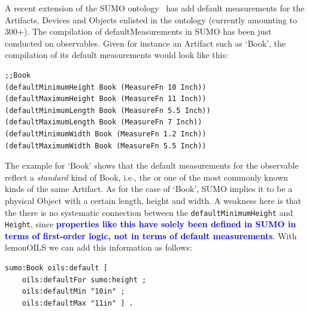 \documentclass[11pt]{article}
\begin{document}
A recent extension of the SUMO ontology~\cite[Suggested Upper Merged Ontology]{nilespease2001sumo} has add
default measurements for the Artifacts, Devices and Objects enlisted in the ontology (currently amounting to 300+). 
The compilation of defaultMeasurements in SUMO has been just conducted on observables. Given for instance an Artifact such as `Book', the compilation of its default measurements would look like this:

\begin{verbatim}
;;Book
(defaultMinimumHeight Book (MeasureFn 10 Inch))
(defaultMaximumHeight Book (MeasureFn 11 Inch))
(defaultMinimumLength Book (MeasureFn 5.5 Inch))
(defaultMaximumLength Book (MeasureFn 7 Inch))
(defaultMinimumWidth Book (MeasureFn 1.2 Inch))
(defaultMaximumWidth Book (MeasureFn 5.5 Inch))
\end{verbatim}


The example for `Book' shows that the default measurements for the observable reflect a \textit{standard} kind of Book,
i.e., the or one of the most commonly known kinds of the same Artifact. As for the case of `Book', SUMO implies it to be a physical Object with a certain length, height and width. 
A weakness here is that the there is no systematic connection between the {\tt defaultMinimumHeight} and {\tt Height}, since \textbf{\textcolor{blue}{properties like this have solely been defined in SUMO in terms of first-order logic, not in terms of default measurements}}. With lemonOILS we can add this information as follows:

\begin{verbatim}
sumo:Book oils:default [
    oils:defaultFor sumo:height ;
    oils:defaultMin "10in" ;
    oils:defaultMax "11in" ] .
\end{verbatim}
\end{document}
